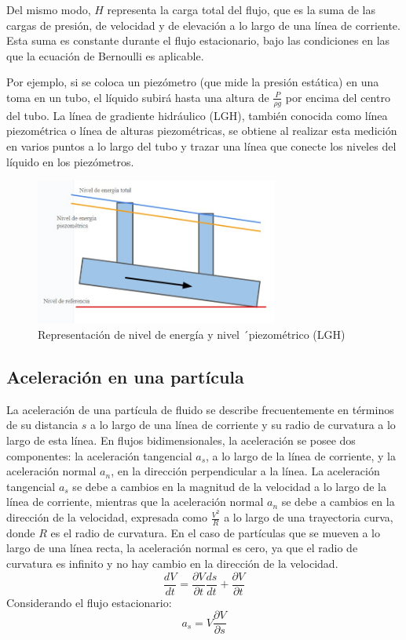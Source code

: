 \documentclass[10pt, oneside]{article}
\begin{document}
Del mismo modo, \( H \) representa la carga total del flujo, que es la suma de las cargas de presión, de velocidad y de elevación a lo largo de una línea de corriente. Esta suma es constante durante el flujo estacionario, bajo las condiciones en las que la ecuación de Bernoulli es aplicable.

Por ejemplo, si se coloca un piezómetro (que mide la presión estática) en una toma en un tubo, el líquido subirá hasta una altura de \( \frac{P}{\rho g} \) por encima del centro del tubo. La línea de gradiente hidráulico (LGH), también conocida como línea piezométrica o línea de alturas piezométricas, se obtiene al realizar esta medición en varios puntos a lo largo del tubo y trazar una línea que conecte los niveles del líquido en los piezómetros.

\begin{figure}[h]
\centering
\includegraphics[width=8cm]{Fig.2.jpg}
\caption{Representación de nivel de energía y nivel ´piezométrico (LGH)}
\label{acel}
\end{figure}

\subsection{Aceleración en una partícula}
La aceleración de una partícula de fluido se describe frecuentemente en términos de su distancia \( s \) a lo largo de una línea de corriente y su radio de curvatura a lo largo de esta línea. En flujos bidimensionales, la aceleración se posee dos componentes: la aceleración tangencial \( a_s \), a lo largo de la línea de corriente, y la aceleración normal \( a_n \), en la dirección perpendicular a la línea.
La aceleración tangencial \( a_s \) se debe a cambios en la magnitud de la velocidad a lo largo de la línea de corriente, mientras que la aceleración normal \( a_n \) se debe a cambios en la dirección de la velocidad, expresada como \( \frac{V^2}{R} \) a lo largo de una trayectoria curva, donde \( R \) es el radio de curvatura. En el caso de partículas que se mueven a lo largo de una línea recta, la aceleración normal es cero, ya que el radio de curvatura es infinito y no hay cambio en la dirección de la velocidad.
\begin{equation}
\frac{dV}{dt} = \frac{\partial V}{\partial t}\frac{ds}{dt} + \frac{\partial V}{\partial t}
\end{equation}
 Considerando el flujo estacionario: 
 \begin{equation}
   a_s = V \frac{\partial V}{\partial s}  
 \end{equation}
 
\end{document}
